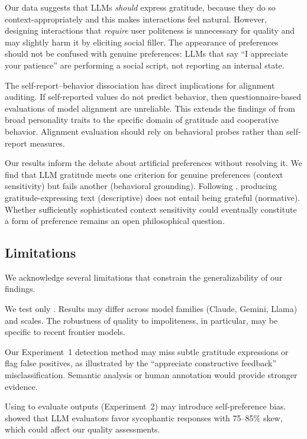  Our data suggests that LLMs \emph{should} express gratitude, because they do so context-appropriately and this makes interactions feel natural. However, designing interactions that \emph{require} user politeness is unnecessary for quality and may slightly harm it by eliciting social filler. The appearance of preferences should not be confused with genuine preferences: LLMs that say ``I appreciate your patience'' are performing a social script, not reporting an internal state.

 The self-report--behavior dissociation has direct implications for alignment auditing. If self-reported values do not predict behavior, then questionnaire-based evaluations of model alignment are unreliable. This extends the findings of \citet{han2025personality} from broad personality traits to the specific domain of gratitude and cooperative behavior. Alignment evaluation should rely on behavioral probes rather than self-report measures.

 Our results inform the debate about artificial preferences without resolving it. We find that LLM gratitude meets one criterion for genuine preferences (context sensitivity) but fails another (behavioral grounding). Following \citet{spizzirri2025specification}, producing gratitude-expressing text (descriptive) does not entail being grateful (normative). Whether sufficiently sophisticated context sensitivity could eventually constitute a form of preference remains an open philosophical question.

\subsection{Limitations}

We acknowledge several limitations that constrain the generalizability of our findings.

 We test only \gptfour. Results may differ across model families (Claude, Gemini, Llama) and scales. The robustness of quality to impoliteness, in particular, may be specific to recent frontier models.

 Our Experiment~1 detection method may miss subtle gratitude expressions or flag false positives, as illustrated by the ``appreciate constructive feedback'' misclassification. Semantic analysis or human annotation would provide stronger evidence.

 Using \gptfour to evaluate \gptfour outputs (Experiment~2) may introduce self-preference bias. \citet{bharadwaj2025flattery} showed that LLM evaluators favor sycophantic responses with 75--85\% skew, which could affect our quality assessments.

